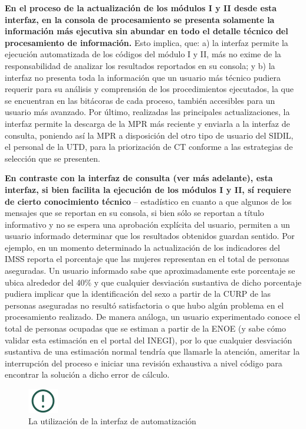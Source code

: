 \documentclass[
]{article}
\begin{document}
\textbf{En el proceso de la actualización de los módulos I y II desde esta interfaz, en la consola de procesamiento se presenta solamente la información más ejecutiva sin abundar en todo el detalle técnico del procesamiento de información.} Esto implica, que: a) la interfaz permite la ejecución automatizada de los códigos del módulo I y II, más no exime de la responsabilidad de analizar los resultados reportados en su consola; y b) la interfaz no presenta toda la información que un usuario más técnico pudiera requerir para su análisis y comprensión de los procedimientos ejecutados, la que se encuentran en las bitácoras de cada proceso, también accesibles para un usuario más avanzado. Por último, realizadas las principales actualizaciones, la interfaz permite la descarga de la MPR más reciente y enviarla a la interfaz de consulta, poniendo así la MPR a disposición del otro tipo de usuario del SIDIL, el personal de la UTD, para la priorización de CT conforme a las estrategias de selección que se presenten.

\textbf{En contraste con la interfaz de consulta (ver más adelante), esta interfaz, si bien facilita la ejecución de los módulos I y II, sí requiere de cierto conocimiento técnico} -- estadístico en cuanto a que algunos de los mensajes que se reportan en su consola, si bien sólo se reportan a título informativo y no se espera una aprobación explícita del usuario, permiten a un usuario informado determinar que los resultados obtenidos guardan sentido. Por ejemplo, en un momento determinado la actualización de los indicadores del IMSS reporta el porcentaje que las mujeres representan en el total de personas aseguradas. Un usuario informado sabe que aproximadamente este porcentaje se ubica alrededor del 40\% y que cualquier desviación sustantiva de dicho porcentaje pudiera implicar que la identificación del sexo a partir de la CURP de las personas aseguradas no resultó satisfactoria o que hubo algún problema en el procesamiento realizado. De manera análoga, un usuario experimentado conoce el total de personas ocupadas que se estiman a partir de la ENOE (y sabe cómo validar esta estimación en el portal del INEGI), por lo que cualquier desviación sustantiva de una estimación normal tendría que llamarle la atención, ameritar la interrupción del proceso e iniciar una revisión exhaustiva a nivel código para encontrar la solución a dicho error de cálculo.

\begin{figure}
\includegraphics[width=50px,style="float:left; background-color: #fff; padding-right:1em"]{images-1/important-icon} \caption{La utilización de la interfaz de automatización}\label{fig:utilizacioninterfazauto}
\end{figure}
\end{document}
